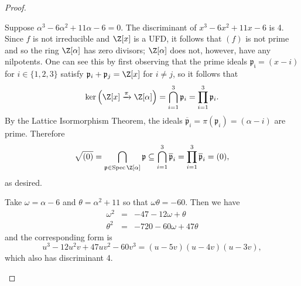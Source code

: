\documentclass[10pt]{amsart}
\begin{document}
\begin{thm}[15 Points]
\begin{proof}
\begin{enumerate}[(a)]
\begin{enumerate}[(i)]
        Suppose $\alpha^3 - 6\alpha^2 + 11\alpha - 6 = 0$.
        The discriminant of $x^3 - 6x^2 + 11x - 6$ is 4.
        Since $f$ is not irreducible and $\Z[x]$ is a UFD, it follows that $(f)$ is not prime and so the ring $\Z[\alpha]$ has zero divisors; $\Z[\alpha]$ does not, however, have any nilpotents.
        One can see this by first observing that the prime ideals $\mathfrak{p_i} = (x - i)$ for $i \in \{1, 2, 3\}$ satisfy $\mathfrak{p}_i + \mathfrak{p}_j = \Z[x]$ for $i \neq j$, so it follows that 
        $$\ker\left(\Z[x] \xrightarrow{\pi} \Z[\alpha]\right) = \bigcap_{i=1}^3 \mathfrak{p}_i = \prod_{i=1}^3 \mathfrak{p}_i.$$
        By the Lattice Isormorphism Theorem, the ideals $\overline{\mathfrak{p}}_i = \pi(\mathfrak{p}_i) = (\alpha - i)$ are prime.
        Therefore
        $$\sqrt{(0)} = \bigcap_{\mathfrak{p} \in \operatorname{Spec} \Z[\alpha]} \mathfrak{p} \subseteq \bigcap_{i=1}^3 \overline{\mathfrak{p}}_i = \prod_{i=1}^3 \overline{\mathfrak{p}}_i = (0),$$
        as desired.
        
        Take $\omega = \alpha - 6$ and $\theta = \alpha^2 + 11$ so that $\omega\theta = -60$.
        Then we have
        \begin{eqnarray*}
          \omega^2 &=& -47 - 12\omega + \theta\\
          \theta^2 &=& -720 -60\omega + 47\theta
        \end{eqnarray*}
        and the corresponding form is
        $$u^3 - 12u^2v + 47uv^2 - 60v^3 = (u - 5v)(u - 4v)(u - 3v),$$
        which also has discriminant 4.
      \end{enumerate}
    \end{enumerate}
  \end{proof}
\end{thm}
\end{document}
